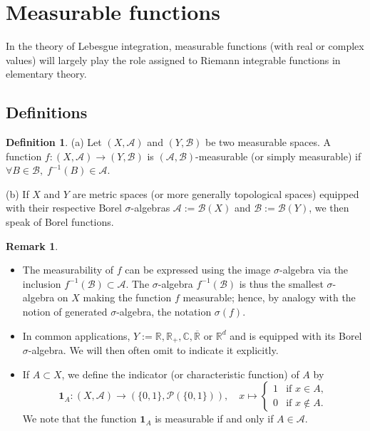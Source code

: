 \documentclass[11pt]{article}
\theoremstyle{definition}
\newtheorem{definition}{Definition}[section]
\newtheorem{remark}{Remark}[section]
\begin{document}
\newpage
\section{Measurable functions}
In the theory of Lebesgue integration, measurable functions (with real or complex values) will largely play the role assigned to Riemann integrable functions in elementary theory.
\subsection{Definitions}
\begin{definition}
(a) Let $(X,\mathscr{A})$ and $(Y,\mathscr{B})$ be two measurable spaces. A function $f:(X,\mathscr{A}) \to (Y,\mathscr{B})$ is $(\mathscr{A},\mathscr{B})$-measurable (or simply measurable) if $\forall B \in \mathscr{B}, \; f^{-1}(B)\in\mathscr{A}$.

(b) If $X$ and $Y$ are metric spaces (or more generally topological spaces) equipped with their respective Borel $\sigma$-algebras $\mathscr{A}:=\mathscr{B}(X)$ and $\mathscr{B}:=\mathscr{B}(Y)$, we then speak of Borel functions.
\end{definition}

\begin{remark}
\begin{itemize}
    \item The measurability of $f$ can be expressed using the image $\sigma$-algebra via the inclusion $f^{-1}(\mathscr{B})\subset \mathscr{A}$. The $\sigma$-algebra $f^{-1}(\mathscr{B})$ is thus the smallest $\sigma$-algebra on $X$ making the function $f$ measurable; hence, by analogy with the notion of generated $\sigma$-algebra, the notation $\sigma(f)$.
    \item In common applications, $Y:=\mathbb{R}, \mathbb{R}_{+}, \mathbb{C}, \overline{\mathbb{R}}$ or $\mathbb{R}^d$ and is equipped with its Borel $\sigma$-algebra. We will then often omit to indicate it explicitly.
    \item If $A\subset X$, we define the indicator (or characteristic function) of $A$ by
    \[
    \mathbf{1}_A:(X,\mathscr{A}) \longrightarrow (\{0,1\},\mathscr{P}(\{0,1\})),
    \quad x\mapsto
    \begin{cases}
    1 &\text{if } x\in A, \\
    0 &\text{if } x\notin A.
    \end{cases}
    \]
    We note that the function $\mathbf{1}_A$ is measurable if and only if $A\in \mathscr{A}$.
\end{itemize}
\end{remark}
\end{document}
